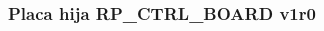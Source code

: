 \documentclass{beamer}
\begin{document}
\begin{frame}
				\frametitle{Placa hija \alert{RP\_CTRL\_BOARD v1r0}}
	\begin{columns}
		\begin{column}{0.50\textwidth}
		\end{column} 
	 	\begin{column}{0.5\textwidth}
	 \end{column}
	\end{columns}
\end{frame}
\end{document}
